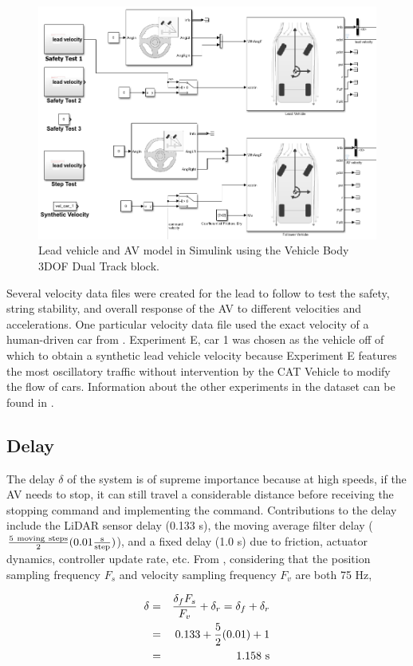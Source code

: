 \documentclass[conference]{IEEEtran}
\begin{document}
\begin{figure}[htbp]
\centerline{\includegraphics[width=3.5 in]{vehicle_body_3dof.png}}
\caption{Lead vehicle and AV model in Simulink using the Vehicle Body 3DOF Dual Track block.}
\label{fig2}
\end{figure}

Several velocity data files were created for the lead to follow to test the safety, string stability, and overall response of the AV to different velocities and accelerations. One particular velocity data file used the exact velocity of a human-driven car from \cite{wu2018arizona}. Experiment E, car 1 was chosen as the vehicle off of which to obtain a synthetic lead vehicle velocity because Experiment E features the most oscillatory traffic without intervention by the CAT Vehicle to modify the flow of cars. Information about the other experiments in the dataset can be found in \cite{wu2019tracking}.


\subsection{Delay}
The delay $\delta$ of the system is of supreme importance because at high speeds, if the AV needs to stop, it can still travel a considerable distance before receiving the stopping command and implementing the command. Contributions to the delay include the LiDAR sensor delay (0.133 s), the moving average filter delay ($\rm {5\ moving\ steps\over 2}(0.01{s\over step})$), and a fixed delay (1.0 s) due to friction, actuator dynamics, controller update rate, etc. From \cite{bhadani2019real}, considering that the position sampling frequency $F_s$ and velocity sampling frequency $F_v$ are both 75 Hz,

\begin{eqnarray*}
\delta &=& {\delta_f F_s \over F_v}+\delta_r = \delta_f +\delta_r \\
&=& 0.133+{5\over 2}(0.01)+1\\
&=& 1.158 \rm\ s
\end{eqnarray*}
\end{document}
